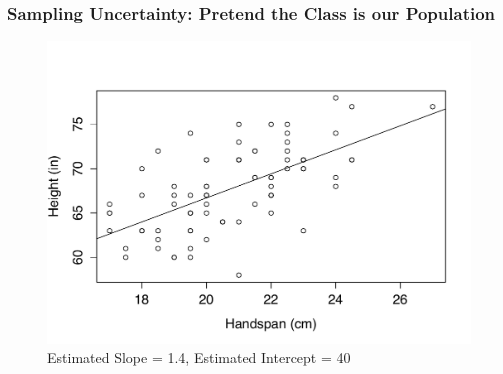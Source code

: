 
\begin{frame}
\frametitle{Sampling Uncertainty: Pretend the Class is our Population}

\begin{figure}[h]
\centering
\includegraphics[scale = 0.5]{./images/height_handspan_reg}
\caption{Estimated Slope = 1.4, Estimated Intercept = 40}
\end{figure}


\end{frame}
